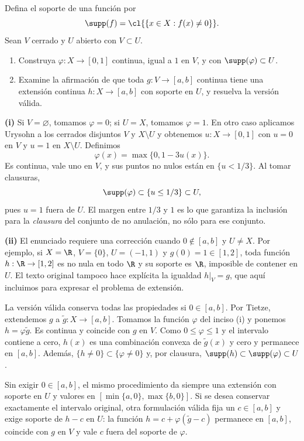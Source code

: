 \begin{ejercicio}\label{ch12:soporte}
Defina el soporte de una función por
\[
 \supp(f)=\cl{\{x\in X:f(x)\ne0\}}.
\]
Sean $V$ cerrado y $U$ abierto con $V\subset U$.
\begin{enumerate}[label=(\roman*)]
\item Construya $\varphi:X\to[0,1]$ continua, igual a $1$ en $V$, y con $\supp(\varphi)\subset U$.
\item Examine la afirmación de que toda $g:V\to[a,b]$ continua tiene una extensión continua $h:X\to[a,b]$ con soporte en $U$, y resuelva la versión válida.
\end{enumerate}
\end{ejercicio}
\begin{solucion}
\textbf{(i)} Si $V=\varnothing$, tomamos $\varphi=0$; si $U=X$, tomamos $\varphi=1$. En otro caso aplicamos Urysohn a los cerrados disjuntos $V$ y $X\setminus U$ y obtenemos $u:X\to[0,1]$ con $u=0$ en $V$ y $u=1$ en $X\setminus U$. Definimos
\[
 \varphi(x)=\max\{0,1-3u(x)\}.
\]
Es continua, vale uno en $V$, y sus puntos no nulos están en $\{u<1/3\}$. Al tomar clausuras,
\[
 \supp(\varphi)\subset\{u\leq1/3\}\subset U,
\]
pues $u=1$ fuera de $U$. El margen entre $1/3$ y $1$ es lo que garantiza la inclusión para la \emph{clausura} del conjunto de no anulación, no sólo para ese conjunto.

\textbf{(ii)} El enunciado requiere una corrección cuando $0\notin[a,b]$ y $U\ne X$. Por ejemplo, si $X=\R$, $V=\{0\}$, $U=(-1,1)$ y $g(0)=1\in[1,2]$, toda función $h:\R\to[1,2]$ es no nula en todo $\R$ y su soporte es $\R$, imposible de contener en $U$. El texto original tampoco hace explícita la igualdad $h|_V=g$, que aquí incluimos para expresar el problema de extensión.

La versión válida conserva todas las propiedades si $0\in[a,b]$. Por Tietze, extendemos $g$ a $\widetilde g:X\to[a,b]$. Tomamos la función $\varphi$ del inciso (i) y ponemos $h=\varphi\widetilde g$. Es continua y coincide con $g$ en $V$. Como $0\leq\varphi\leq1$ y el intervalo contiene a cero, $h(x)$ es una combinación convexa de $\widetilde g(x)$ y cero y permanece en $[a,b]$. Además, $\{h\ne0\}\subset\{\varphi\ne0\}$ y, por clausura, $\supp(h)\subset\supp(\varphi)\subset U$.

Sin exigir $0\in[a,b]$, el mismo procedimiento da siempre una extensión con soporte en $U$ y valores en $[\min\{a,0\},\max\{b,0\}]$. Si se desea conservar exactamente el intervalo original, otra formulación válida fija un $c\in[a,b]$ y exige soporte de $h-c$ en $U$: la función $h=c+\varphi(\widetilde g-c)$ permanece en $[a,b]$, coincide con $g$ en $V$ y vale $c$ fuera del soporte de $\varphi$.
\end{solucion}

